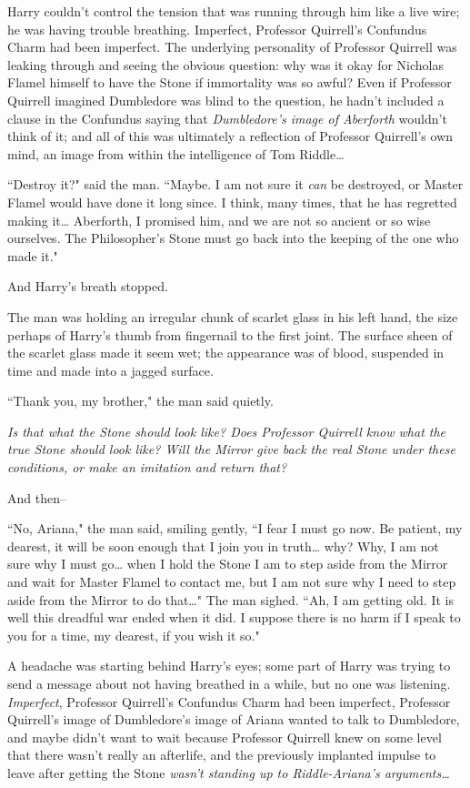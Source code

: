 Harry couldn't control the tension that was running through him like a live wire; he was having trouble breathing. Imperfect, Professor Quirrell's Confundus Charm had been imperfect. The underlying personality of Professor Quirrell was leaking through and seeing the obvious question: why was it okay for Nicholas Flamel himself to have the Stone if immortality was so awful? Even if Professor Quirrell imagined Dumbledore was blind to the question, he hadn't included a clause in the Confundus saying that \emph{Dumbledore's image of Aberforth} wouldn't think of it; and all of this was ultimately a reflection of Professor Quirrell's own mind, an image from within the intelligence of Tom Riddle{\ldots}

``Destroy it?" said the man. ``Maybe. I am not sure it \emph{can} be destroyed, or Master Flamel would have done it long since. I think, many times, that he has regretted making it{\ldots} Aberforth, I promised him, and we are not so ancient or so wise ourselves. The Philosopher's Stone must go back into the keeping of the one who made it."

And Harry's breath stopped.

The man was holding an irregular chunk of scarlet glass in his left hand, the size perhaps of Harry's thumb from fingernail to the first joint. The surface sheen of the scarlet glass made it seem wet; the appearance was of blood, suspended in time and made into a jagged surface.

``Thank you, my brother," the man said quietly.

\emph{Is that what the Stone should look like? Does Professor Quirrell know what the true Stone should look like? Will the Mirror give back the real Stone under these conditions, or make an imitation and return that?}

And then\---

``No, Ariana," the man said, smiling gently, ``I fear I must go now. Be patient, my dearest, it will be soon enough that I join you in truth{\ldots} why? Why, I am not sure why I must go{\ldots} when I hold the Stone I am to step aside from the Mirror and wait for Master Flamel to contact me, but I am not sure why I need to step aside from the Mirror to do that{\ldots}" The man sighed. ``Ah, I am getting old. It is well this dreadful war ended when it did. I suppose there is no harm if I speak to you for a time, my dearest, if you wish it so."

A headache was starting behind Harry's eyes; some part of Harry was trying to send a message about not having breathed in a while, but no one was listening. \emph{Imperfect}, Professor Quirrell's Confundus Charm had been imperfect, Professor Quirrell's image of Dumbledore's image of Ariana wanted to talk to Dumbledore, and maybe didn't want to wait because Professor Quirrell knew on some level that there wasn't really an afterlife, and the previously implanted impulse to leave after getting the Stone \emph{wasn't standing up to Riddle-Ariana's arguments{\ldots}}


